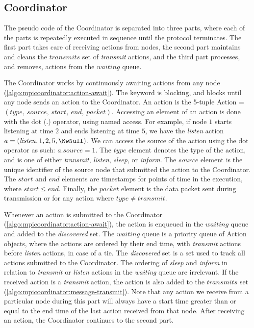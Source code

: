 \subsection{Coordinator}\label{sec:coordinatorpseudo}
The pseudo code of the Coordinator is separated into three parts, where each of the parts is repeatedly
executed in sequence until the protocol terminates. The first part takes care of receiving actions from
nodes, the second part maintains and cleans the $\mathit{transmits}$ set of \textit{transmit} actions, and the
third part processes, and removes, actions from the $\mathit{waiting}$ queue. \medbreak

The Coordinator works by continuously awaiting actions from any node
(\autoref{algo:mpicoordinator:action-await}). The \KwAwait keyword is blocking, and blocks until any node
sends an action to the Coordinator. An action is the 5-tuple Action = $(\mathit{type},\ \mathit{source},\
\mathit{start},\ \mathit{end},\ \mathit{packet})$. Accessing an element of an action is done with the dot
($.$) operator, using named access. For example, if node $1$ starts listening at time $2$ and ends listening
at time $5$, we have the \textit{listen} action $a = (\mathit{listen}, 1, 2, 5, \KwNull)$. We can access the
source of the action using the dot operator as such: $a.source = 1$. The $\mathit{type}$ element denotes the
type of the action, and is one of either \textit{transmit}, \textit{listen}, \textit{sleep}, or
\textit{inform}. The $\mathit{source}$ element is the unique identifier of the source node that submitted the
action to the Coordinator. The $\mathit{start}$ and $\mathit{end}$ elements are timestamps for points of time
in the execution, where $\mathit{start} \leq \mathit{end}$. Finally, the $\mathit{packet}$ element is the data
packet sent during transmission or \KwNull for any action where $\mathit{type} \neq \mathit{transmit}$.
\medbreak

Whenever an action is submitted to the Coordinator (\autoref{algo:mpicoordinator:action-await}), the action is
enqueued in the $\mathit{waiting}$ queue and added to the \textit{discovered} set. The $\mathit{waiting}$
queue is a priority queue of Action objects, where the actions are ordered by their end time, with
\textit{transmit} actions before \textit{listen} actions, in case of a tie. The \textit{discovered} set is
a set used to track all actions submitted to the Coordinator. The ordering of \textit{sleep} and
\textit{inform} in relation to \textit{transmit} or \textit{listen} actions in the \textit{waiting} queue are
irrelevant. If the received action is a \textit{transmit} action, the action is also added to the
$\mathit{transmits}$ set (\autoref{algo:mpicoordinator:message-transmit}). Note that any action we receive
from a particular node during this part will always have a start time greater than or equal to the end time of
the last action received from that node. After receiving an action, the Coordinator continues to the second
part. \medbreak

